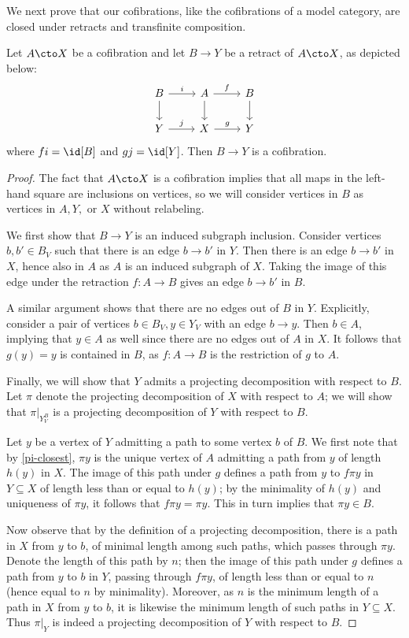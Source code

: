 We next prove that our cofibrations, like the cofibrations of a model category, are closed under retracts and transfinite composition.

\begin{proposition}\label{retract-closure}
Let $A \cto X$ be a cofibration and let $B \to Y$ be a retract of $A \cto X$, as depicted below:
\[
\begin{tikzcd}
B \arrow[d] \arrow[r,"i",above] & A \arrow[d] \arrow[r,"f",above] & B \arrow[d] \\
Y \arrow[r,"j",above] & X \arrow[r,"g",above] & Y
\end{tikzcd}
\]
where $fi = \id[B]$ and $gj = \id[Y]$. Then $B \to Y$ is a cofibration.
\end{proposition}

\begin{proof}
The fact that $A \cto X$ is a cofibration implies that all maps in the left-hand square are inclusions on vertices, so we will consider vertices in $B$ as vertices in $A,Y,$ or $X$ without relabeling. 

We first show that $B \to Y$ is an induced subgraph inclusion. Consider vertices $b, b' \in B_V$ such that there is an edge $b \to b'$ in $Y$. Then there is an edge $b \to b'$ in $X$, hence also in $A$ as $A$ is an induced subgraph of $X$. Taking the image of this edge under the retraction $f \colon A \to B$ gives an edge $b \to b'$ in $B$.

A similar argument shows that there are no edges out of $B$ in $Y$. Explicitly, consider a pair of vertices $b \in B_V, y \in Y_V$ with an edge $b \to y$. Then $b \in A$, implying that $y \in A$ as well since there are no edges out of $A$ in $X$. It follows that $g(y) = y$ is contained in $B$, as $f \colon A \to B$ is the restriction of $g$ to $A$. 

Finally, we will show that $Y$ admits a projecting decomposition with respect to $B$. Let $\pi$ denote the projecting decomposition of $X$ with respect to $A$; we will show that $\pi |_{Y_V^B}$ is a projecting decomposition of $Y$ with respect to $B$.

Let $y$ be a vertex of $Y$ admitting a path to some vertex $b$ of $B$. We first note that by \cref{pi-closest}, $\pi y$ is the unique vertex of $A$ admitting a path from $y$ of length $h(y)$ in $X$. The image of this path under $g$ defines a path from $y$ to $f \pi y$ in $Y \subseteq X$ of length less than or equal to $h(y)$; by the minimality of $h(y)$ and uniqueness of $\pi y$, it follows that $f \pi y = \pi y$. This in turn implies that $\pi y \in B$.

Now observe that by the definition of a projecting decomposition, there is a path in $X$ from $y$ to $b$, of minimal length among such paths, which passes through $\pi y$. Denote the length of this path by $n$; then the image of this path under $g$ defines a path from $y$ to $b$ in $Y$, passing through $f \pi y$, of length less than or equal to $n$ (hence equal to $n$ by minimality). Moreover, as $n$ is the minimum length of a path in $X$ from $y$ to $b$, it is likewise the minimum length of such paths in $Y \subseteq X$. Thus $\pi |_{Y}$ is indeed a projecting decomposition of $Y$ with respect to $B$.
\end{proof}


